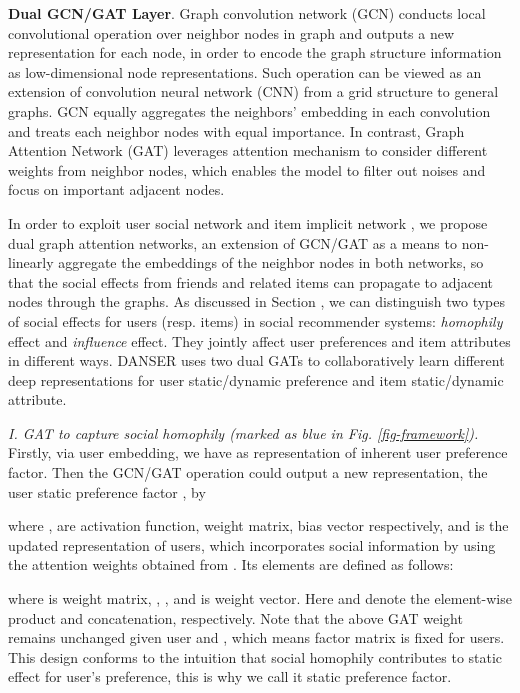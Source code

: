 \documentclass[sigconf]{acmart}
\begin{document}
\textbf{Dual GCN/GAT Layer}. 
Graph convolution network (GCN) \cite{GCN1} conducts local convolutional operation over neighbor nodes in graph and outputs a new representation for each node, in order to encode the graph structure information as low-dimensional node representations. 
Such operation can be viewed as an extension of convolution neural network (CNN) from a grid structure to general graphs. GCN equally aggregates the neighbors' embedding in each convolution and treats each neighbor nodes with equal importance. 
In contrast, Graph Attention Network (GAT) \cite{GAT} leverages attention mechanism to consider different weights from neighbor nodes, which enables the model to filter out noises and focus on important adjacent nodes.

In order to exploit user social network  and item implicit network , we propose dual graph attention networks, an extension of GCN/GAT as a means to non-linearly aggregate the embeddings of the neighbor nodes in both networks, so that the social effects from friends and related items can propagate to adjacent nodes through the graphs.
As discussed in Section , we can distinguish two types of social effects for users (resp. items) in social recommender systems: \emph{homophily} effect and \emph{influence} effect. 
They jointly affect user preferences and item attributes in different ways. DANSER uses two dual GATs to collaboratively learn different deep representations for user static/dynamic preference and item static/dynamic attribute. 

\emph{I. GAT to capture social homophily (marked as blue in Fig. \ref{fig-framework}).} 
Firstly, via user embedding, we have  as representation of inherent user preference factor. 
Then the GCN/GAT operation could output a new representation{, the user static preference factor ,} by

where ,  are activation function, weight matrix, bias vector respectively, and  is the {updated} representation of users, which incorporates social information by using the attention weights  obtained from . 
Its elements are defined as follows:

where  is weight matrix, , , and  is weight vector. Here  and  denote the element-wise product and concatenation, respectively.
Note that the above GAT weight  remains unchanged given user  and , which means factor matrix  is fixed for users. 
This design conforms to the intuition that social homophily contributes to static effect for user's preference, {this is why} we call it static preference factor.
\end{document}
